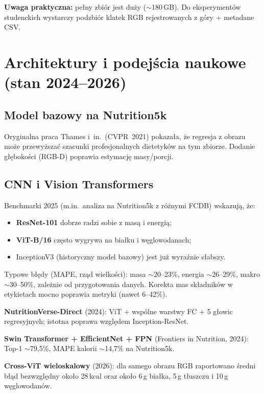 \documentclass[11pt,a4paper]{article}
\begin{document}
\textbf{Uwaga praktyczna:} pełny zbiór jest duży ($\sim$180\,GB).
Do eksperymentów studenckich wystarczy podzbiór klatek RGB rejestrowanych z góry
+ metadane CSV.

\section{Architektury i podejścia naukowe (stan 2024--2026)}

\subsection{Model bazowy na Nutrition5k}
Oryginalna praca Thames i~in.\ (CVPR~2021) pokazała, że regresja z obrazu
może przewyższać szacunki profesjonalnych dietetyków na tym zbiorze.
Dodanie głębokości (RGB-D) poprawia estymację masy/porcji.

\subsection{CNN i Vision Transformers}
Benchmarki 2025 (m.in.\ analiza na Nutrition5k z różnymi FCDB)
wskazują, że:
\begin{itemize}[leftmargin=*]
  \item \textbf{ResNet-101} dobrze radzi sobie z masą i energią;
  \item \textbf{ViT-B/16} często wygrywa na białku i węglowodanach;
  \item InceptionV3 (historyczny model bazowy) jest już wyraźnie słabszy.
\end{itemize}
Typowe błędy (MAPE, rząd wielkości): masa $\sim$20--23\%,
energia $\sim$26--29\%, makro $\sim$30--50\%, zależnie od przygotowania danych.
Korekta mas składników w etykietach mocno poprawia metryki (nawet 6--42\%).

\textbf{NutritionVerse-Direct} (2024): ViT + wspólne warstwy FC + 5 głowic
regresyjnych; istotna poprawa względem Inception-ResNet.

\textbf{Swin Transformer + EfficientNet + FPN} (Frontiers in Nutrition, 2024):
Top-1 $\sim$79{,}5\%, MAPE kalorii $\sim$14{,}7\% na Nutrition5k.

\textbf{Cross-ViT wieloskalowy} (2026): dla samego obrazu RGB raportowano
średni błąd bezwzględny około 28\,kcal oraz około 6\,g białka, 5\,g tłuszczu
i 10\,g węglowodanów.
\end{document}
